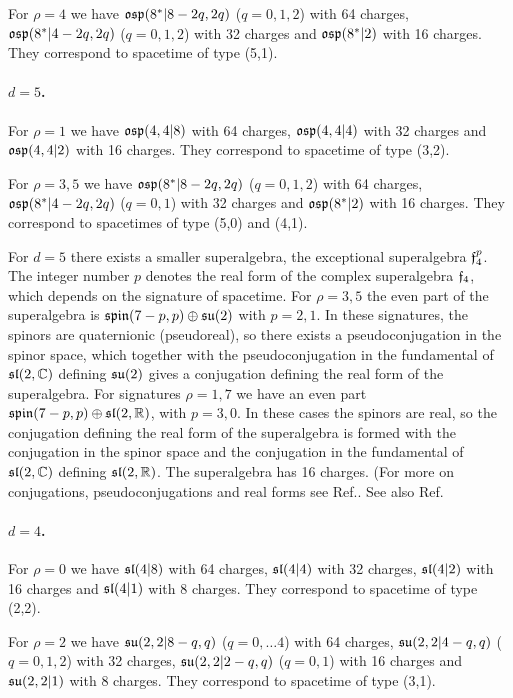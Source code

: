\documentclass[a4paper,12pt]{article}
\begin{document}
\smallskip

\noindent For $\rho=4$ we have $\mathfrak{osp}(8^*|8-2q,2q)$ ($q=0,1,2$)
with 64 charges, $\mathfrak{osp}(8^*|4-2q,2q)$ ($q=0,1,2$) with 32 charges
and $\mathfrak{osp}(8^*|2)$ with 16 charges. They correspond to spacetime
of type (5,1).

 \paragraph{$d=5$.}For $\rho=1$ we have $\mathfrak{osp}(4,4|8)$  with 64 charges, $\mathfrak{osp}(4,4|4)$
 with 32 charges and $\mathfrak{osp}(4,4|2)$ with 16 charges. They
 correspond to
spacetime of type (3,2).

\smallskip

\noindent  For $\rho=3,5$ we have $\mathfrak{osp}(8^*|8-2q,2q)$ ($q=0,1,2$)
with 64 charges, $\mathfrak{osp}(8^*|4-2q,2q)$ ($q=0,1$) with 32 charges
and $\mathfrak{osp}(8^*|2)$ with 16 charges. They correspond to spacetimes
of type (5,0) and (4,1).

For $d=5$ there exists a smaller superalgebra, the exceptional
superalgebra $\mathfrak{f}_4^p$. The integer number $p$ denotes the real
form of the complex superalgebra $\mathfrak{f}_4$, which depends on the
signature of spacetime.  For $\rho=3, 5$ the even part of the
superalgebra is $\mathfrak{spin}(7-p,p)\oplus\mathfrak{su}(2)$ with $p=2,1$. In
these signatures, the spinors are quaternionic (pseudoreal), so
there exists a pseudoconjugation in the spinor space, which
together with the pseudoconjugation in the fundamental of
$\mathfrak{sl}(2,\mathbb{C})$ defining $\mathfrak{su}(2)$ gives a conjugation defining the
real form of the superalgebra. For signatures $\rho=1,7$ we have
an even part $\mathfrak{spin}(7-p,p)\oplus\mathfrak{sl}(2,\mathbb{R})$, with $p=3,0$. In
these cases the spinors are real, so the conjugation defining the
real form of the superalgebra is formed with the conjugation in
the spinor space and the conjugation in the fundamental of
$\mathfrak{sl}(2, \mathbb{C})$ defining $\mathfrak{sl}(2,\mathbb{R})$.  The superalgebra has 16
charges. (For more on conjugations, pseudoconjugations and real
forms see Ref.\cite{dflv}. See also Ref.\cite{vp}

\paragraph{$d=4$.}For $\rho=0$ we have $\mathfrak{sl}(4| 8)$ with 64
charges, $\mathfrak{sl}(4| 4)$ with 32 charges, $\mathfrak{sl}(4| 2)$ with 16
charges and $\mathfrak{sl}(4|1)$ with 8 charges. They correspond to
spacetime of type (2,2).

\smallskip

\noindent For $\rho=2$  we have $\mathfrak{su}(2,2|8-q,q)$ ($q=0,\dots 4$)
with 64 charges, $\mathfrak{su}(2,2|4-q,q)$ ($q=0,1,2$) with 32 charges,
$\mathfrak{su}(2,2|2-q,q)$ ($q=0,1$) with 16 charges and $\mathfrak{su}(2,2|1)$ with
8 charges. They correspond to
 spacetime of type (3,1).
\end{document}

